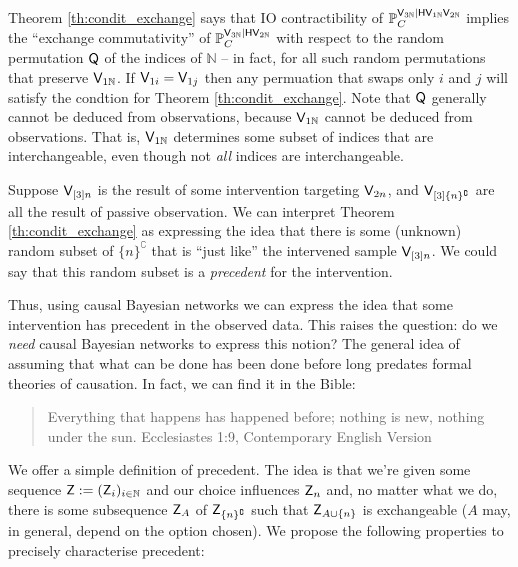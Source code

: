 Theorem \ref{th:condit_exchange} says that IO contractibility of $\mathbb{P}_C^{\mathsf{V}_{3\mathbb{N}}|\mathsf{H}\mathsf{V}_{1\mathbb{N}}\mathsf{V}_{2\mathbb{N}}}$ implies the ``exchange commutativity'' of $\mathbb{P}_C^{\mathsf{V}_{3\mathbb{N}}|\mathsf{H}\mathsf{V}_{2\mathbb{N}}}$ with respect to the random permutation $\mathsf{Q}$ of the indices of $\mathbb{N}$ -- in fact, for all such random permutations that preserve $\mathsf{V}_{1\mathbb{N}}$. If $\mathsf{V}_{1i}=\mathsf{V}_{1j}$ then any permuation that swaps only $i$ and $j$ will satisfy the condtion for Theorem \ref{th:condit_exchange}. Note that $\mathsf{Q}$ generally cannot be deduced from observations, because $\mathsf{V}_{1\mathbb{N}}$ cannot be deduced from observations. That is, $\mathsf{V}_{1\mathbb{N}}$ determines some subset of indices that are interchangeable, even though not \emph{all} indices are interchangeable. 

Suppose $\mathsf{V}_{[3]n}$ is the result of some intervention targeting $\mathsf{V}_{2n}$, and $\mathsf{V}_{[3]\{n\}^\complement}$ are all the result of passive observation. We can interpret Theorem \ref{th:condit_exchange} as expressing the idea that there is some (unknown) random subset of $\{n\}^\complement$ that is ``just like'' the intervened sample $\mathsf{V}_{[3]n}$. We could say that this random subset is a \emph{precedent} for the intervention.

Thus, using causal Bayesian networks we can express the idea that some intervention has precedent in the observed data. This raises the question: do we \emph{need} causal Bayesian networks to express this notion? The general idea of assuming that what can be done has been done before long predates formal theories of causation. In fact, we can find it in the Bible:
\begin{quote}
Everything that happens has happened before; nothing is new, nothing under the sun. Ecclesiastes 1:9, Contemporary English Version
\end{quote}

We offer a simple definition of precedent. The idea is that we're given some sequence $\mathsf{Z}:=(\mathsf{Z}_i)_{i\in\mathbb{N}}$ and our choice influences $\mathsf{Z}_n$ and, no matter what we do, there is some subsequence $\mathsf{Z}_A$ of $\mathsf{Z}_{\{n\}^\complement}$ such that $\mathsf{Z}_{A\cup\{n\}}$ is exchangeable ($A$ may, in general, depend on the option chosen). We propose the following properties to precisely characterise precedent:

